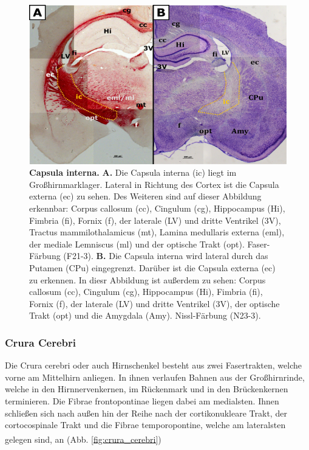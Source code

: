 \documentclass[12pt,a4paper,pdftex]{article}
\begin{document}
\begin{figure}[H]
    \centering
    \includegraphics[width=\textwidth]{pictures/Bilder_Laura/internal_capsule_F21_3P_025x_N23_3P_025x.png}
    \caption[Capsula interna]{\textbf{Capsula interna.} \textbf{A.} Die Capsula interna (ic) liegt im Großhirnmarklager. Lateral in Richtung des Cortex ist die Capsula externa (ec) zu sehen. Des Weiteren sind auf dieser Abbildung erkennbar: Corpus callosum (cc), Cingulum (cg), Hippocampus (Hi), Fimbria (fi), Fornix (f), der laterale (LV) und dritte Ventrikel (3V), Tractus mammilothalamicus (mt), Lamina medullaris externa (eml), der mediale Lemniscus (ml) und der optische Trakt (opt). Faser-Färbung (F21-3). \textbf{B.} Die Capsula interna wird lateral durch das Putamen (CPu) eingegrenzt. Darüber ist die Capsula externa (ec) zu erkennen. In diesr Abbildung ist außerdem zu sehen: Corpus callosum (cc), Cingulum (cg), Hippocampus (Hi), Fimbria (fi), Fornix (f), der laterale (LV) und dritte Ventrikel (3V), der optische Trakt (opt) und die Amygdala (Amy). Nissl-Färbung (N23-3).}
    \label{fig:Capsula_interna}
\end{figure}


\subsubsection*{Crura Cerebri} 
Die Crura cerebri oder auch Hirnschenkel besteht aus zwei Fasertrakten, welche vorne am Mittelhirn anliegen. In ihnen verlaufen Bahnen aus der Großhirnrinde, welche in den Hirnnervenkernen, im Rückenmark und in den Brückenkernen terminieren. Die Fibrae frontopontinae liegen dabei am medialsten. Ihnen schließen sich nach außen hin der Reihe nach der cortikonukleare Trakt, der cortocospinale Trakt und die Fibrae temporopontine, welche am lateralsten gelegen sind, an \textsuperscript{\cite[6]{trepel2011neuroanatomie}} (Abb. \ref{fig:crura_cerebri})
\end{document}
